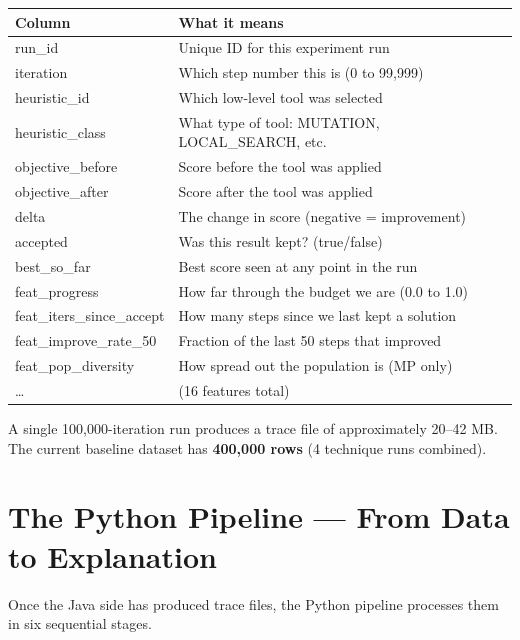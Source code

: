 \documentclass[12pt, a4paper]{article}
\begin{document}
\vspace{0.3cm}
\begin{center}
\begin{tabularx}{\linewidth}{>{\ttfamily\small}p{4.5cm} X}
\toprule
\textbf{Column} & \textbf{What it means} \\
\midrule
run\_id & Unique ID for this experiment run \\
iteration & Which step number this is (0 to 99,999) \\
heuristic\_id & Which low-level tool was selected \\
heuristic\_class & What type of tool: MUTATION, LOCAL\_SEARCH, etc. \\
objective\_before & Score before the tool was applied \\
objective\_after & Score after the tool was applied \\
delta & The change in score (negative = improvement) \\
accepted & Was this result kept? (true/false) \\
best\_so\_far & Best score seen at any point in the run \\
feat\_progress & How far through the budget we are (0.0 to 1.0) \\
feat\_iters\_since\_accept & How many steps since we last kept a solution \\
feat\_improve\_rate\_50 & Fraction of the last 50 steps that improved \\
feat\_pop\_diversity & How spread out the population is (MP only) \\
\ldots & (16 features total) \\
\bottomrule
\end{tabularx}
\end{center}

\vspace{0.4cm}
A single 100,000-iteration run produces a trace file of approximately 20--42 MB.
The current baseline dataset has \textbf{400,000 rows} (4 technique runs combined).

\section{The Python Pipeline --- From Data to Explanation}

Once the Java side has produced trace files, the Python pipeline processes them
in six sequential stages.
\end{document}
